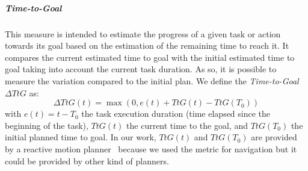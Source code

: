 \documentclass[a4paper,11pt,twoside]{StyleThese}
\begin{document}
\subparagraph{Time-to-Goal}\label{para:dtg_t}
This measure is intended to estimate the progress of a given task or action towards its goal based on the estimation of the remaining time to reach it. It compares the current estimated time to goal with the initial estimated time to goal taking into account the current task duration. As so, it is possible to measure the variation compared to the initial plan. We define the \textit{Time-to-Goal} $\Delta TtG$ as:
\begin{equation}\label{eq:ttg}
\Delta TtG(t) = \max(0, e(t)  + TtG(t) - TtG(T_0))
\end{equation}
with $e(t) = t - T_0$ the task execution duration (time elapsed since the beginning of the task), $TtG(t)$ the current time to the goal, and $TtG(T_0)$ the initial planned time to goal. In our work, $TtG(t)$ and $TtG(T_0)$ are provided by a reactive motion planner~\cite{khamb2019} because we used the metric for navigation but it could be provided by other kind of planners. 
\end{document}
